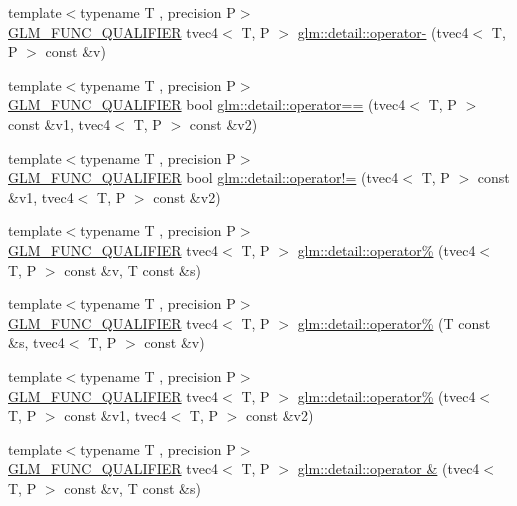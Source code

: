 \begin{DoxyCompactItemize}
{\footnotesize template$<$typename T , precision P$>$ }\\\hyperlink{setup_8hpp_a33fdea6f91c5f834105f7415e2a64407}{G\+L\+M\+\_\+\+F\+U\+N\+C\+\_\+\+Q\+U\+A\+L\+I\+F\+I\+ER} tvec4$<$ T, P $>$ \hyperlink{namespaceglm_1_1detail_aaa30257846d074ba9816d0407d45515e}{glm\+::detail\+::operator-\/} (tvec4$<$ T, P $>$ const \&v)
\item 
{\footnotesize template$<$typename T , precision P$>$ }\\\hyperlink{setup_8hpp_a33fdea6f91c5f834105f7415e2a64407}{G\+L\+M\+\_\+\+F\+U\+N\+C\+\_\+\+Q\+U\+A\+L\+I\+F\+I\+ER} bool \hyperlink{namespaceglm_1_1detail_ac34cc4ad3aecb2b4b0f82927cc1314f3}{glm\+::detail\+::operator==} (tvec4$<$ T, P $>$ const \&v1, tvec4$<$ T, P $>$ const \&v2)
\item 
{\footnotesize template$<$typename T , precision P$>$ }\\\hyperlink{setup_8hpp_a33fdea6f91c5f834105f7415e2a64407}{G\+L\+M\+\_\+\+F\+U\+N\+C\+\_\+\+Q\+U\+A\+L\+I\+F\+I\+ER} bool \hyperlink{namespaceglm_1_1detail_a102e4d6f08c29d787de7321a8aa56196}{glm\+::detail\+::operator!=} (tvec4$<$ T, P $>$ const \&v1, tvec4$<$ T, P $>$ const \&v2)
\item 
{\footnotesize template$<$typename T , precision P$>$ }\\\hyperlink{setup_8hpp_a33fdea6f91c5f834105f7415e2a64407}{G\+L\+M\+\_\+\+F\+U\+N\+C\+\_\+\+Q\+U\+A\+L\+I\+F\+I\+ER} tvec4$<$ T, P $>$ \hyperlink{namespaceglm_1_1detail_a6db36483bd57d7046c6ae9ac6142c7a6}{glm\+::detail\+::operator\%} (tvec4$<$ T, P $>$ const \&v, T const \&s)
\item 
{\footnotesize template$<$typename T , precision P$>$ }\\\hyperlink{setup_8hpp_a33fdea6f91c5f834105f7415e2a64407}{G\+L\+M\+\_\+\+F\+U\+N\+C\+\_\+\+Q\+U\+A\+L\+I\+F\+I\+ER} tvec4$<$ T, P $>$ \hyperlink{namespaceglm_1_1detail_a1c6aeaba04ed367a9d4679950f9ed69a}{glm\+::detail\+::operator\%} (T const \&s, tvec4$<$ T, P $>$ const \&v)
\item 
{\footnotesize template$<$typename T , precision P$>$ }\\\hyperlink{setup_8hpp_a33fdea6f91c5f834105f7415e2a64407}{G\+L\+M\+\_\+\+F\+U\+N\+C\+\_\+\+Q\+U\+A\+L\+I\+F\+I\+ER} tvec4$<$ T, P $>$ \hyperlink{namespaceglm_1_1detail_ad49ea24851996a6b9dabd6f512970785}{glm\+::detail\+::operator\%} (tvec4$<$ T, P $>$ const \&v1, tvec4$<$ T, P $>$ const \&v2)
\item 
{\footnotesize template$<$typename T , precision P$>$ }\\\hyperlink{setup_8hpp_a33fdea6f91c5f834105f7415e2a64407}{G\+L\+M\+\_\+\+F\+U\+N\+C\+\_\+\+Q\+U\+A\+L\+I\+F\+I\+ER} tvec4$<$ T, P $>$ \hyperlink{namespaceglm_1_1detail_afce06d0c2b81488eaca936ffe1681223}{glm\+::detail\+::operator \&} (tvec4$<$ T, P $>$ const \&v, T const \&s)

\end{DoxyCompactItemize}
